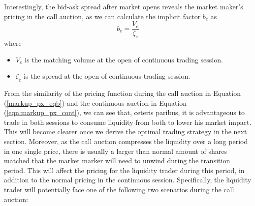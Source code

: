 \documentclass{article}
\begin{document}
Interestingly, the bid-ask spread after market opens reveals the market maker's pricing in the call
auction, as we can calculate the implicit factor $b_e$ as
\[
  b_e = \frac{V_e}{\zeta_e}
\]
where
\begin{itemize}
  \item $V_e$ is the matching volume at the open of continuous trading session.
  \item $\zeta_e$ is the spread at the open of continuous trading session.
\end{itemize}

From the similarity of the pricing function during the call auction in Equation (\ref{markup_px_eqb}) and the continuous auction in Equation (\ref{eqn:markup_px_cont}), we can see that, ceteris paribus, it is advantageous to trade in both sessions to consume liquidity from both to lower his market impact. This will become clearer once we derive the optimal trading strategy in the next section. Moreover, as the call auction compresses the liquidity over a long period in one single price, there is usually a larger than normal amount of shares matched that the market marker will need to unwind during the transition period. This will affect the pricing for the liquidity trader during this period, in addition to the normal pricing in the continuous session. Specifically, the liquidity trader will potentially face one of the following two scenarios during the call auction:
\end{document}
